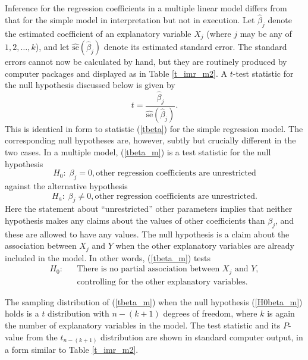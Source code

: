 Inference for the regression coefficients in a multiple
linear model differs from that for the simple model in interpretation
but not in execution. Let $\hat{\beta}_{j}$ denote the estimated
coefficient of an explanatory variable $X_{j}$ (where $j$ may be any of
$1,2,\dots,k$), and let $\hat{\text{se}}(\hat{\beta}_{j})$ denote its
estimated standard error. The standard errors cannot now be calculated
by hand, but they are routinely produced by computer packages and
displayed as in Table \ref{t_imr_m2}. A $t$-test statistic for the null
hypothesis discussed below is given by
\begin{equation}
t=\frac{\hat{\beta}_{j}}{\hat{\text{se}}(\hat{\beta}_{j})}.
\label{tbeta_m}
\end{equation}
This is identical in form to statistic
(\ref{tbeta}) for the simple regression model. The corresponding null
hypotheses are, however, subtly but crucially different in
the two cases. In a multiple model, (\ref{tbeta_m}) is a test statistic
for the null hypothesis
\begin{equation}
H_{0}:\; \beta_{j}=0, \text{other regression coefficients
are unrestricted}
\label{H0beta_m}
\end{equation}
against the alternative hypothesis
\[
H_{a}:\; \beta_{j}\ne0, \text{other regression coefficients
are unrestricted}.
\]
Here the statement about ``unrestricted'' other parameters implies that
neither hypothesis makes any claims about the values of other
coefficients than $\beta_{j}$, and these are allowed to have any
values. The null hypothesis is a claim about the association between
$X_{j}$ and $Y$ when the other explanatory variables are already
included in the model. In other words, (\ref{tbeta_m}) tests
\begin{eqnarray*}
H_{0}:& & \text{There is no partial association between }
X_{j} \text{ and } Y,\\
&&  \text{controlling for the other explanatory
variables.}
\end{eqnarray*}

The sampling distribution of (\ref{tbeta_m}) when the null hypothesis
(\ref{H0beta_m}) holds is a $t$ distribution with $n-(k+1)$ degrees
of freedom, where $k$ is again the number of explanatory variables in the
model. The test statistic and its $P$-value from the $t_{n-(k+1)}$
distribution are shown in standard computer output, in a form similar to
Table \ref{t_imr_m2}.

